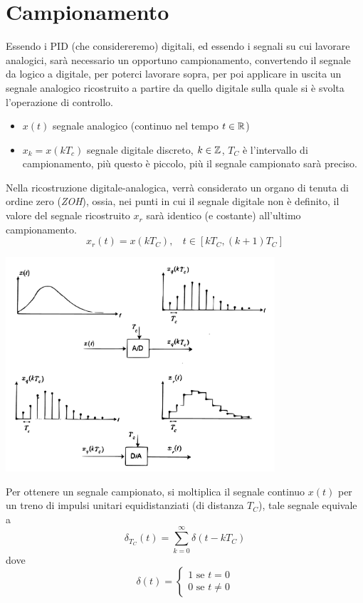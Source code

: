 \documentclass[10pt, letterpaper]{report}
\begin{document}
\section{Campionamento}
Essendo i PID (che considereremo) digitali, ed essendo i segnali su cui lavorare analogici, sarà necessario un opportuno campionamento, convertendo il segnale da logico a digitale, per poterci lavorare sopra, per poi applicare in uscita un segnale analogico ricostruito a partire da quello digitale sulla quale si è svolta l'operazione di controllo.
\begin{itemize}
    \item $x(t)$ segnale analogico (continuo nel tempo $t\in{\mathbb R}$)
    \item $x_k=x(kT_c)$ segnale digitale discreto, $k\in{\mathbb Z}$, $T_C$ è l'intervallo di campionamento, più questo è piccolo, più il segnale campionato sarà preciso. 
\end{itemize}
Nella ricostruzione digitale-analogica, verrà considerato un organo di tenuta di ordine zero (\textit{ZOH}), ossia, nei punti in cui il segnale digitale non è definito, il valore del segnale ricostruito $ x_r$ sarà identico (e costante) all'ultimo campionamento.
$$ x_r(t)=x(kT_C), \ \ \ \ t\in [kT_C, (k+1)T_C]$$
\begin{center}
    \includegraphics[width=0.75\textwidth]{images/campionamento.pdf}
\end{center}
Per ottenere un segnale campionato, si moltiplica il segnale continuo $x(t)$ per un treno di impulsi unitari equidistanziati (di distanza $T_C$), tale segnale equivale a 
$$ \delta_{T_C}(t)=\sum_{k=0}^\infty \delta(t-kT_C)$$ 
dove 
$$ \delta(t)=\begin{cases}
    1 \text{ se } t=0 \\0 \text{ se } t\ne 0 
\end{cases}$$
\end{document}
